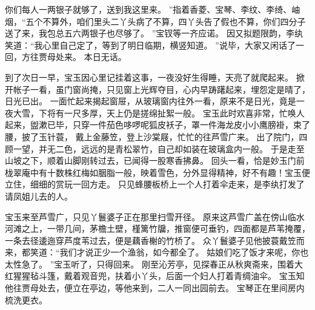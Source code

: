 你们每人一两银子就够了，送到我这里来。
”指着香菱、宝琴、李纹、李绮、岫烟，“五个不算外，咱们里头二丫头病了不算，四丫头告了假也不算，你们四分子送了来，我包总五六两银子也尽够了。
”宝钗等一齐应诺。
因又拟题限韵，李纨笑道：“我心里自己定了，等到了明日临期，横竖知道。
”说毕，大家又闲话了一回，方往贾母处来。
本日无话。
\par
到了次日一早，宝玉因心里记挂着这事，一夜没好生得睡，天亮了就爬起来。
掀开帐子一看，虽门窗尚掩，只见窗上光辉夺目，心内早踌躇起来，埋怨定是晴了，日光已出。
一面忙起来揭起窗屉，从玻璃窗内往外一看，原来不是日光，竟是一夜大雪，下将有一尺多厚，天上仍是搓绵扯絮一般。
宝玉此时欢喜非常，忙唤人起来，盥漱已毕，只穿一件茄色哆啰呢狐皮袄子，罩一件海龙皮小小鹰膀褂，束了腰，披了玉针蓑，
戴上金藤笠，登上沙棠屐，忙忙的往芦雪广来。
出了院门，四顾一望，并无二色，远远的是青松翠竹，自己却如装在玻璃盒内一般。
于是走至山坡之下，顺着山脚刚转过去，已闻得一股寒香拂鼻。
回头一看，恰是妙玉门前栊翠庵中有十数株红梅如胭脂一般，映着雪色，分外显得精神，好不有趣！宝玉便立住，细细的赏玩一回方走。
只见蜂腰板桥上一个人打着伞走来，是李纨打发了请凤姐儿去的人。
\par
宝玉来至芦雪广，只见丫鬟婆子正在那里扫雪开径。
原来这芦雪广盖在傍山临水河滩之上，一带几间，茅檐土壁，槿篱竹牖，推窗便可垂钓，四面都是芦苇掩覆，一条去径逶迤穿芦度苇过去，便是藕香榭的竹桥了。
众丫鬟婆子见他披蓑戴笠而来，都笑道：“我们才说正少一个渔翁，如今都全了。
姑娘们吃了饭才来呢，你也太性急了。
”宝玉听了，只得回来。
刚至沁芳亭，见探春正从秋爽斋来，围着大红猩猩毡斗篷，戴着观音兜，扶着小丫头，后面一个妇人打着青绸油伞。
宝玉知他往贾母处去，便立在亭边，等他来到，二人一同出园前去。
宝琴正在里间房内梳洗更衣。
\par


